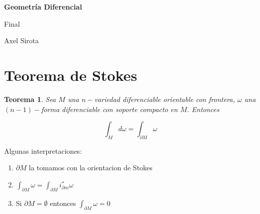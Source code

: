 \documentclass[11pt]{article}
\newtheorem{theorem}{Teorema}
\numberwithin{theorem}{subsection}
\newenvironment{remark}[1][Observaci\'on]{\begin{trivlist}
		\item[\hskip \labelsep {\bfseries #1}]}{\end{trivlist}}
\begin{document}
	
	\pagestyle{empty}
	\pagestyle{fancy}
	\fancyfoot[CO]{\slshape \thepage}
	\renewcommand{\headrulewidth}{0pt}
	
	
	
	\centerline{\bf Geometr\'ia Diferencial}
	\centerline{\sc Final}
	\centerline{\sc Axel Sirota}
	
	\tableofcontents
	\newpage

\section{Teorema de Stokes}

\begin{theorem}
	Sea $M$ una $n-$variedad diferenciable orientable con frontera, $\omega$ una $(n-1)-$forma diferenciable con soporte compacto en $M$. Entonces
	
	\begin{equation}
		\int_{M} {d\omega} = \int_{\partial M} \omega
	\end{equation}
	
\end{theorem}

\begin{remark}
	Algunas interpretaciones:
	
	\begin{enumerate}
		
		\item $\partial M$ la tomamos con la orientacion de Stokes
		\item $\int_{\partial M} \omega = \int_{\partial M} {i^*_{\partial m}\omega}$
		\item Si  $\partial M = \emptyset$ entonces $\int_{\partial M} \omega = 0 $
		
	\end{enumerate}
	
\end{remark}
\end{document}
